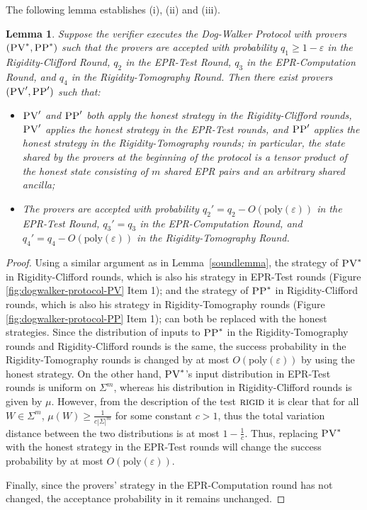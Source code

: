 \documentclass[11pt,letter]{article}
\newtheorem{lemma}[theorem]{Lemma}
\theoremstyle{remark}
\theoremstyle{definition}
\newcommand{\ket}[1]{|#1\rangle}
\newcommand{\eps}{\varepsilon}
\newcommand{\rigid}{\textsc{rigid}}
\newcommand{\pv}{\textsc{PV}}
\newcommand{\pp}{\textsc{PP}}
\newcommand{\norm}[1]{\left\|#1\right\|}
\begin{document}
 The following lemma establishes (i), (ii) and (iii). 

\begin{lemma}\label{lem:PV-2-PP-4}
Suppose the verifier executes the Dog-Walker Protocol %
with provers $(\pv^*,\pp^*)$ such that the provers are accepted with probability $q_1\geq 1-\eps$ in the Rigidity-Clifford Round, $q_2$ in the EPR-Test Round, $q_3$ in the EPR-Computation Round, and $q_4$ in the Rigidity-Tomography Round. Then there exist provers $(\pv',\pp')$ such that:
\begin{itemize}[nolistsep]
\item $\pv'$ and $\pp'$ both apply the honest strategy in the Rigidity-Clifford rounds, $\pv'$ applies the honest strategy in the EPR-Test rounds, and $\pp'$ applies the honest strategy in the Rigidity-Tomography rounds; in particular, the state shared by the provers at the beginning of the protocol is a tensor product of the honest state consisting of $m$ shared EPR pairs and an arbitrary shared ancilla;
\item The provers are accepted with probability $q_2'=q_2-O(\mathrm{poly}(\eps))$ in the EPR-Test Round, $q_3'=q_3$ in the EPR-Computation Round, and $q_4'=q_4-O(\mathrm{poly}(\eps))$ in the Rigidity-Tomography Round. 
\end{itemize}
\end{lemma}

\begin{proof}
Using a similar argument as in Lemma~\ref{soundlemma}, the strategy of $\pv^*$ in
Rigidity-Clifford rounds, which is also his strategy in EPR-Test rounds (Figure \ref{fig:dogwalker-protocol-PV} Item 1); and the strategy of $\pp^*$ in Rigidity-Clifford rounds, which is also his strategy in Rigidity-Tomography rounds (Figure \ref{fig:dogwalker-protocol-PP} Item 1);
 can both be replaced with the honest strategies. Since the distribution of inputs to $\pp^*$ in the Rigidity-Tomography rounds and Rigidity-Clifford rounds is the same, the success probability in the Rigidity-Tomography rounds is changed by at most $O(\mathrm{poly}(\eps))$ by using the honest strategy. 
On the other hand, $\pv^*$'s input distribution in EPR-Test rounds is uniform on $\Sigma^m$, whereas his distribution in Rigidity-Clifford rounds is given by $\mu$. However, from the description of the test $\rigid$ it is clear that for all $W\in\Sigma^m$, $\mu(W)\geq \frac{1}{c|\Sigma|^m}$ for some constant $c>1$, thus the total variation distance between the two distributions is at most $1-\frac{1}{c}$. Thus, replacing $\pv^*$ with the honest strategy in the EPR-Test  rounds will change the success probability by at most  $O(\mathrm{poly}(\eps))$. 

Finally, since the provers' strategy in the EPR-Computation round has not changed, the
  acceptance probability in it remains unchanged.
\end{proof}
\end{document}

